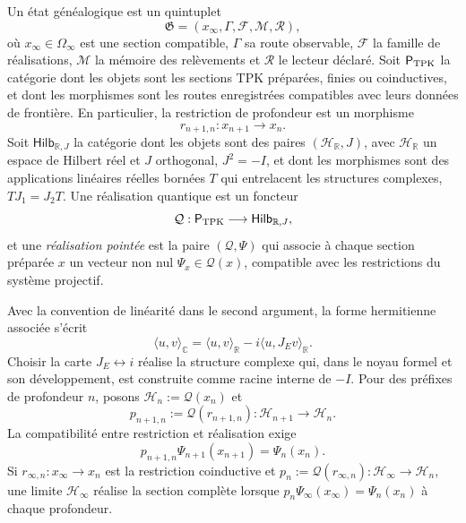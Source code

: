 \begin{definition}
\label{v:v:rec:realizacion_evolucion:statement:01}
Un état généalogique est un quintuplet
\begin{equation}
 \mathfrak G=(x_\infty,\Gamma,\mathcal F,\mathcal M,\mathcal R),
 \label{v:v:rec:eq:estado-genealogico-realizado-rev2}
\end{equation}
où \(x_\infty\in\Omega_\infty\) est une section compatible,
\(\Gamma\) sa route observable, \(\mathcal F\) la famille de réalisations,
\(\mathcal M\) la mémoire des relèvements et \(\mathcal R\) le lecteur
déclaré. Soit \(\mathsf P_{\rm TPK}\) la catégorie dont les objets sont les
sections TPK préparées, finies ou coinductives, et dont les morphismes sont les
routes enregistrées compatibles avec leurs données de frontière. En particulier, la
restriction de profondeur est un morphisme
\[
 r_{n+1,n}:x_{n+1}\longrightarrow x_n.
\]
Soit \(\mathsf{Hilb}_{\mathbb R,J}\) la catégorie dont les objets
sont des paires \((\mathcal H_{\mathbb R},J)\), avec \(\mathcal H_{\mathbb R}\)
un espace de Hilbert réel et \(J\) orthogonal, \(J^2=-I\), et dont les morphismes sont
des applications linéaires réelles bornées \(T\) qui entrelacent les structures
complexes, \(TJ_1=J_2T\). Une réalisation quantique est un foncteur
\[
 \mathcal Q:\mathsf P_{\rm TPK}\longrightarrow
 \mathsf{Hilb}_{\mathbb R,J},
\]
et une \emph{réalisation pointée} est la paire \((\mathcal Q,\Psi)\) qui associe
à chaque section préparée \(x\) un vecteur non nul
\(\Psi_x\in\mathcal Q(x)\), compatible avec les restrictions du système
projectif.
\end{definition}

Avec la convention de linéarité dans le second argument, la forme hermitienne associée
s’écrit
\[
 \langle u,v\rangle_{\mathbb C}
 =\langle u,v\rangle_{\mathbb R}
  -i\langle u,J_E v\rangle_{\mathbb R}.
\]
Choisir la carte \(J_E\leftrightarrow i\) réalise la structure complexe qui,
dans le noyau formel et son développement, est construite comme racine interne de \(-I\). Pour des préfixes de
profondeur \(n\), posons
\(\mathcal H_n:=\mathcal Q(x_n)\) et
\[
 p_{n+1,n}:=\mathcal Q(r_{n+1,n}):
 \mathcal H_{n+1}\longrightarrow\mathcal H_n.
\]
La compatibilité entre restriction et réalisation exige
\begin{equation}
 p_{n+1,n}\Psi_{n+1}(x_{n+1})=\Psi_n(x_n).
 \label{v:v:rec:eq:compatibilidad-realizacion-hilbert-rev2}
\end{equation}
Si \(r_{\infty,n}:x_\infty\to x_n\) est la restriction coinductive et
\(p_n:=\mathcal Q(r_{\infty,n}):\mathcal H_\infty\to\mathcal H_n\), une
limite \(\mathcal H_\infty\) réalise la section complète lorsque
\(p_n\Psi_\infty(x_\infty)=\Psi_n(x_n)\) à chaque profondeur.

